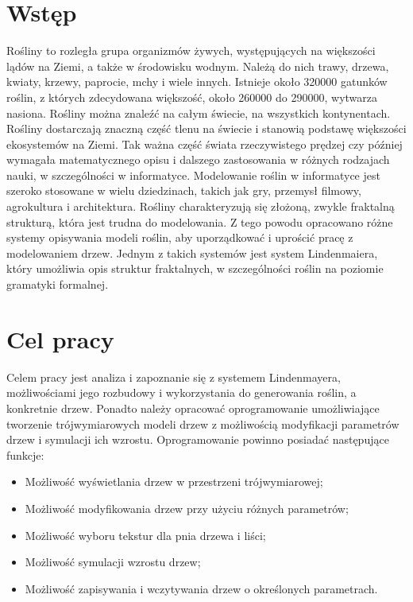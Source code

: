 \documentclass[a4paper,12pt,oneside]{book} %
\begin{document}
\sloppy
\thispagestyle{empty}

\newpage{}

\thispagestyle{empty}
\newpage{}

\tableofcontents{}

\chapter*{Wstęp} 

Rośliny to rozległa grupa organizmów żywych, występujących na większości 
lądów na Ziemi, a także w środowisku wodnym. 
Należą do nich trawy, drzewa, kwiaty, krzewy, paprocie, mchy i wiele innych.
Istnieje około 320000 gatunków roślin, z których zdecydowana większość,
około 260000 do 290000, wytwarza nasiona. Rośliny można znaleźć na 
całym świecie, na wszystkich kontynentach. Rośliny dostarczają znaczną część 
tlenu na świecie i stanowią podstawę
większości ekosystemów na Ziemi. Tak ważna część świata rzeczywistego prędzej 
czy później wymagała matematycznego opisu i dalszego zastosowania w różnych rodzajach nauki, w
szczególności w informatyce. Modelowanie roślin w informatyce
jest szeroko stosowane w wielu dziedzinach, takich jak gry, przemysł filmowy, 
agrokultura i architektura. Rośliny charakteryzują się złożoną,
zwykle fraktalną strukturą, która jest trudna do modelowania.
Z tego powodu opracowano różne systemy opisywania modeli roślin,
aby uporządkować i uprościć pracę z modelowaniem drzew. Jednym z
takich systemów jest system Lindenmaiera, który umożliwia opis struktur 
fraktalnych, w szczególności roślin na poziomie gramatyki formalnej.



\chapter*{Cel pracy} 

Celem pracy jest analiza i zapoznanie się z systemem Lindenmayera, 
możliwościami jego rozbudowy i wykorzystania do generowania roślin, 
a konkretnie drzew. Ponadto należy opracować oprogramowanie umożliwiające 
tworzenie trójwymiarowych modeli drzew z możliwością modyfikacji 
parametrów drzew i symulacji ich wzrostu. Oprogramowanie powinno posiadać 
następujące funkcje:

\begin{itemize}

\item Możliwość wyświetlania drzew w przestrzeni trójwymiarowej;
\item Możliwość modyfikowania drzew przy użyciu różnych parametrów;
\item Możliwość wyboru tekstur dla pnia drzewa i liści;
\item Możliwość symulacji wzrostu drzew;
\item Możliwość zapisywania i wczytywania drzew o określonych parametrach.

\end{itemize}
\end{document}
